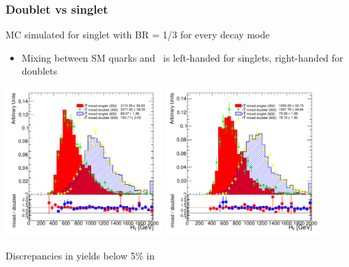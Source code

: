 
\begin{frame}\frametitle{Doublet vs singlet}
\centering\myskip\scriptsize

MC simulated for {\cccolor singlet \T} with BR = 1/3 for
every decay mode

\begin{itemize}
\item Mixing between SM quarks and \T\ is {\cccolor left-handed} for singlets, {\cccolor right-handed} for doublets
\end{itemize}

\includegraphics[width=0.45\textwidth]{pics/doubletcomp_HTAll_ELEMUON_6jetin3btagex_NOMINAL}
\includegraphics[width=0.45\textwidth]{pics/doubletcomp_HTAll_ELEMUON_6jetin4btagin_NOMINAL}

Discrepancies in yields below 5\% in \pchiv

\end{frame}


